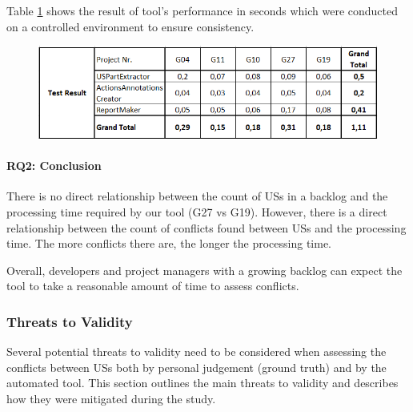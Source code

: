 Table \ref{tb:conflict_performance_result} shows the result of tool's performance in seconds which were conducted on a controlled environment to ensure consistency.
	\begin{figure}[h]
	\begingroup
	\scriptsize
	\centering
	\includegraphics[scale=0.75]{Table/conflict_performance_result.png}
	\label{tb:conflict_performance_result}
	\endgroup
\end{figure}
\paragraph{RQ2: Conclusion}There is no direct relationship between the count of USs in a backlog and the processing time required by our tool (G27 vs G19).
However, there is a direct relationship between the count of conflicts found between USs and the processing time. The more conflicts there are, the longer the processing time. 

Overall, developers and project managers with a growing backlog can expect the tool to take a reasonable amount of time to assess conflicts.
\subsubsection*{Threats to Validity}
Several potential threats to validity need to be considered when assessing the conflicts between USs both by personal judgement (ground truth) and by the automated tool. This section outlines the main threats to validity and describes how they were mitigated during the study.
